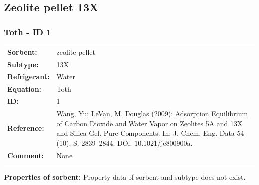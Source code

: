 \subsection{Zeolite pellet 13X}
%
\subsubsection{Toth - ID 1}
%
\begin{tabular}[l]{|lp{11.5cm}|}
\hline
\addlinespace

\textbf{Sorbent:} & zeolite pellet \\
\textbf{Subtype:} & 13X \\
\textbf{Refrigerant:} & Water \\
\textbf{Equation:} & Toth \\
\textbf{ID:} & 1 \\
\textbf{Reference:} & Wang, Yu; LeVan, M. Douglas (2009): Adsorption Equilibrium of Carbon Dioxide and Water Vapor on Zeolites 5A and 13X and Silica Gel. Pure Components. In: J. Chem. Eng. Data 54 (10), S. 2839–2844. DOI: 10.1021/je800900a. \\
\textbf{Comment:} & None \\

\addlinespace
\hline
\end{tabular}
\newline

\textbf{Properties of sorbent:}
\newline
%
Property data of sorbent and subtype does not exist.

